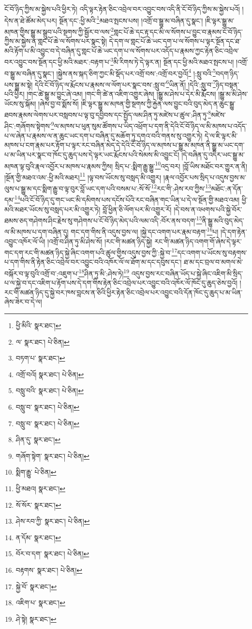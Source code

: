 ངོ་བོ་ཉིད་ཀྱིས་མ་སྐྱེས་པའི་ཕྱིར་ཏེ། འདི་ལྟར་རྟེན་ཅིང་འབྲེལ་བར་འབྱུང་བས་འདི་ནི་ངོ་བོ་ཉིད་ཀྱིས་མ་སྐྱེས་པའོ། །དེས་ན་ཐེ་ཚོམ་མེད་པར། སྔོན་དང་:ཕྱི་མའི་\footnote{ཕྱི་མིའི་  སྣར་ཐང་། }མཐའ་སྤངས་པས། །འགྲོ་བ་སྒྱུ་མ་བཞིན་དུ་སྣང་། །ཇི་ལྟར་སྒྱུ་མ་མཁན་གྱིས་སྒྱུ་མ་སྒྲུབ་པའི་སྔགས་ཀྱི་སྦྱོར་བ་ལས་\footnote{ལ་  སྣར་ཐང་།  པེ་ཅིན། }གླང་པོ་ཆེ་དང་རྟ་དང་མི་ལ་སོགས་པ་བྱུང་བ་རྣམས་ངོ་བོ་ཉིད་ཀྱིས་མ་སྐྱེས་ན་གླང་པོ་ཆེ་ལ་སོགས་པར་སྣང་སྟེ། དེ་དག་ལ་གླང་པོ་ཆེ་ཡང་དག་པ་ལ་སོགས་པ་ལྟར་སྔོན་དང་ཐ་མའི་རྟོག་པ་མི་འབྱུང་བ་དེ་བཞིན་དུ་གླང་པོ་ཆེ་ཡང་དག་པ་ལ་སོགས་པར་འདོད་པ་རྣམས་ཀྱང་རྟེན་ཅིང་འབྲེལ་བར་འབྱུང་བས་སྔོན་དང་ཕྱི་མའི་མཐར་:བརྟག་པ་\footnote{བཏག་པ་  སྣར་ཐང་། }མི་རིགས་ཏེ་དེ་ལྟར་ན། སྔོན་དང་ཕྱི་མའི་མཐའ་སྤངས་པ། །འགྲོ་བ་སྒྱུ་མ་བཞིན་དུ་སྣང་། །སྐྱེས་ནས་སྐད་ཅིག་ཀྱང་མི་སྡོད་པར་འགྲོ་བས་:འགྲོ་བར་བྱའོ།\footnote{འགྲོ་བའོ།  སྣར་ཐང་།  པེ་ཅིན། } །:སླུ་བའི་\footnote{བསླུ་བའི་  སྣར་ཐང་།  པེ་ཅིན། }བདག་ཉིད་པས་སྒྱུ་མ་སྟེ། དེའི་ངོ་བོ་ཉིད་ལ་རྨོངས་པ་རྣམས་ལ་ལོག་པར་སྣང་བས་:སླུ་བ་\footnote{བསླུ་བ་  སྣར་ཐང་།  པེ་ཅིན། }ཡིན་ནོ། །དེའི་:སླུ་བ་\footnote{བསླུ་བ་  སྣར་ཐང་།  པེ་ཅིན། }ཉིད་བསྟན་པའི་ཕྱིར། །གང་ཚེ་སྒྱུ་མ་བྱུང་ཞེ་འམ། །གང་གི་ཚེ་ན་འཇིག་འགྱུར་ཞེས། །སྒྱུ་མ་ཤེས་པ་དེར་མི་རྨོངས། །སྒྱུ་མ་མི་ཤེས་ཡོངས་སུ་སྐོམ། །ཞེས་བྱ་བ་སྨོས་སོ། །ཇི་ལྟར་སྒྱུ་མ་མཁན་གྱི་སྔགས་ཀྱི་རྐྱེན་ལས་བྱུང་བའི་བུད་མེད་ན་ཆུང་སྒྱུ་ཐབས་རྣམས་ལེགས་པར་བསླབས་པ་ལྟ་བུ་དབྱིབས་དང་སྤྱོད་ལམ་ཤིན་ཏུ་མཛེས་པ་ཚུལ་:ཤིན་ཏུ་\footnote{ཤིན་དུ་  སྣར་ཐང་། }མཛེས་ཤིང་:གཞོགས་སྟེགས་\footnote{གཞོག་སྟེག་  སྣར་ཐང་།  པེ་ཅིན། }ལ་མཁས་པ་ཕུན་སུམ་ཚོགས་པ་ཡིད་འཕྲོག་པ་དག་ནི་དེའི་ངོ་བོ་ཉིད་ལ་མི་མཁས་པ་འདོད་པ་ལ་ཞེན་པ་རྣམས་ལ་ན་ཆུང་ཡང་དག་པ་བཞིན་དུ་མཆོག་ཏུ་དགའ་བའི་གནས་སུ་འགྱུར་ཏེ། དེ་ལ་ཇི་ལྟར་མི་མཁས་པ་ངག་རྣམ་པར་རྟོག་པ་ལྟར་རང་བཞིན་མེད་དེ་དེའི་ངོ་བོ་ཉིད་ལ་མཁས་པ་སྒྱུ་མ་མཁན་ནི་སྒྱུ་མ་ཡང་དག་པ་མ་ཡིན་པར་སྣང་བ་ཁོང་དུ་ཆུད་པས་དེ་ལྟར་ཡང་རྨོངས་པའི་སེམས་མི་འབྱུང་ངོ། །དེ་བཞིན་དུ་འདིར་ཡང་སྒྱུ་མ་མཁན་ལྟ་བུའི་རྣལ་འབྱོར་པ་མཁས་པ་རྣམས་ཀྱིས། སྲིད་པ་:སྨིག་རྒྱུ་སྒྱུ་\footnote{སྨིག་རྒྱུ་  པེ་ཅིན། }འདྲ་བར། །བློ་ཡིས་མཐོང་བར་གྱུར་ན་ནི། །སྔོན་གྱི་མཐའ་འམ་:ཕྱི་མའི་མཐར།\footnote{ཕྱི་མཐའ།  སྣར་ཐང་། } །ལྟ་བས་ཡོངས་སུ་བསླད་མི་འགྱུར། །རྣལ་འབྱོར་པས་སྲིད་པ་འདུས་བྱས་མ་ལུས་པ་སྒྱུ་མ་དང་སྨིག་རྒྱུ་བ་ལྟ་བུར་བློ་ཡང་དག་པའི་བསམ་པ་:སོ་སོ་\footnote{སོ་སོར་  སྣར་ཐང་། }རང་གི་:ཤེས་རབ་ཀྱིས་\footnote{ཤེས་རབ་ཀྱི་  སྣར་ཐང་།  པེ་ཅིན། }མཐོང་:ན་དོན་དམ་\footnote{ན་དོམ་  སྣར་ཐང་། }པའི་ངོ་བོ་ཉིད་དུ་གང་ཡང་མི་དམིགས་པས་དངོས་པོའི་རང་བཞིན་གང་ཡིན་པ་དེ་ལ་སྔོན་གྱི་མཐའ་འམ། ཕྱི་མའི་མཐར་ཡོངས་སུ་བསླད་པར་མི་འགྱུར་ཏེ། བློ་ཕྱིན་ཅི་ལོག་པར་མི་འགྱུར་རོ། །དེ་བས་ན་འཕགས་པའི་སྐྱེ་བོར་ཐམས་ཅད་གཤེགས་ཤིང་རྗེས་སུ་གཤེགས་པ་ངོ་བོ་ཉིད་མེད་པའི་ལམ་འདི་:བོར་ནས་བདག་\footnote{བོར་བ་དག་  སྣར་ཐང་།  པེ་ཅིན། }ནི་སྒྱུ་མའི་བུད་མེད་ལ་མི་མཁས་པ་དག་བཞིན་དུ། གང་དག་གིས་ནི་འདུས་བྱས་ལ། །སྐྱེ་དང་འགག་པར་རྣམ་བརྟག་\footnote{བརྟགས་  སྣར་ཐང་།  པེ་ཅིན། }པ། །དེ་དག་རྟེན་འབྱུང་འཁོར་ལོ་ཡི། །འགྲོ་བ་ཤིན་ཏུ་མི་ཤེས་སོ། །རང་གི་མཚན་ཉིད་སྐྱེ། རང་གི་མཚན་ཉིད་འགག་གོ་ཞེས་དེ་ལྟར་གང་དག་རང་གི་མཚན་ཉིད་སྐྱེ་ཞིང་འགག་པའི་ཚུལ་གྱིས་འདུས་བྱས་ཀྱི་:སྐྱེ་བ་\footnote{སྐྱེ་བོ་  སྣར་ཐང་། }དང་འགག་པ་ཡོངས་སུ་བརྟགས་པ་དག་གིས་ནི་རྟེན་ཅིང་འབྲེལ་བར་འབྱུང་བའི་འཁོར་ལོ་ལ་ཐོག་མ་དང་དབུས་དང་། ཐ་མ་དང་བྲལ་བ་མགལ་མེ་བསྐོར་བ་ལྟ་བུའི་འགྲོ་བ་:འཇུག་པ་\footnote{འཇིག་པ་  སྣར་ཐང་། }ཤིན་ཏུ་མི་:ཤེས་ཏེ།\footnote{ཤེ་སྟེ།  སྣར་ཐང་། } འདུས་བྱས་རང་བཞིན་ཡོད་པ་སྐྱེ་ཞིང་འཇིག་མི་སྲིད་པ་ལ་སྐྱེ་བ་དང་འཇིག་པ་རྟོག་པས་དེ་དག་གིས་རྟེན་ཅིང་འབྲེལ་པར་འབྱུང་བའི་འཁོར་ལོ་ཁོང་དུ་ཆུད་ཅེས་བྱའོ། །རང་གི་མཚན་ཉིད་དུ་སྐྱེ་བར་ཁས་བླངས་ན་ཅིའི་ཕྱིར་རྟེན་ཅིང་འབྲེལ་པར་འབྱུང་བའི་དོན་ཁོང་དུ་ཆུད་པ་མ་ཡིན་ཞེས་ཟེར་བ་དེ་ལ། 